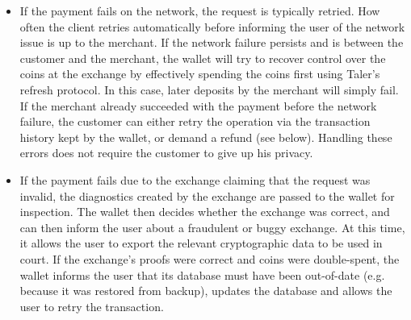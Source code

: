 \documentclass{llncs}
\begin{document}
\begin{itemize}
\item If the payment fails on the network, the request is typically
 retried.  How often the client retries automatically before informing
 the user of the network issue is up to the merchant.  If the network
 failure persists and is between the customer and the merchant, the wallet
 will try to recover control over the coins at the exchange by
 effectively spending the coins first using Taler's
 refresh protocol.  In this case, later deposits by the merchant
 will simply fail.  If the merchant already succeeded with the payment
 before the network failure, the customer can either retry the
 operation via the transaction history kept by the wallet, or demand a refund (see
 below).  Handling these errors does not require the customer to give
 up his privacy.
\item If the payment fails due to the exchange
 claiming that the request was invalid, the diagnostics created by the
 exchange are passed to the wallet for inspection.  The wallet then
 decides whether the exchange was correct, and can then inform the
 user about a fraudulent or buggy exchange.  At this time, it allows
 the user to export the relevant cryptographic data to be used in
 court.  If the exchange's proofs were correct and coins were
 double-spent, the wallet informs the user that its database must have
 been out-of-date (e.g. because it was restored from backup),
 updates the database and allows the user to retry
 the transaction.
\end{itemize}
\end{document}

